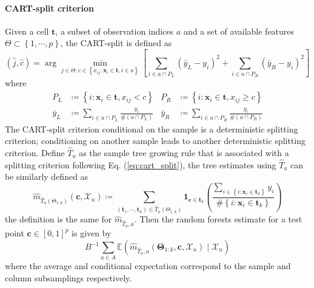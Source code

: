 \documentclass[twoside]{article}
\begin{document}
\paragraph*{CART-split criterion}
Given a cell $\mathbf{t}$, a subset of observation indices $a$ and a set of available features $\Theta \subset \left\{ 1,\cdots,p \right\}$, the CART-split is defined as 
\begin{equation}\label{eq:cart_split}
    \left(\hat{j},\hat{c}\right) = \arg\min_{j\in\Theta,c\in \left\{x_{ij}:\mathbf{x}_i\in\mathbf{t},i\in a\right\}} \left[ \sum_{i\in a \cap P_L}\left(\bar{y}_L-y_i\right)^2 + \sum_{i\in a\cap P_R}\left(\bar{y}_R-y_i\right)^2 \right]
\end{equation}
where 
\begin{align*}
    P_L & \coloneq \left\{ i: \mathbf{x}_i\in\mathbf{t},x_{ij}<c \right\} & P_R & \coloneq  \left\{ i: \mathbf{x}_i\in\mathbf{t},x_{ij}\geq c \right\}\\
    \bar{y}_L & \coloneq \sum_{i\in a \cap P_L}\frac{y_i}{\# \left(a\cap P_L\right)} & \bar{y}_R & \coloneq \sum_{i\in a \cap P_R}\frac{y_i}{\# \left(a\cap P_R\right)}
\end{align*}
The CART-split criterion conditional on the sample is a deterministic splitting criterion; conditioning on another sample leads to another deterministic splitting criterion. Define $\hat{T}_a$ as the sample tree growing rule that is associated with a splitting criterion following Eq. (\ref{eq:cart_split}), the tree estimates using $\hat{T}_a$ can be similarly defined as 
\begin{equation*}
    \hat{m}_{\hat{T}_a(\Theta_{1:k})} \left(\mathbf{c},\mathcal{X}_n\right) \coloneq \sum_{\left(\mathbf{t}_1,\cdots,\mathbf{t}_k\right)\in\hat{T}_a\left(\Theta_{1:k}\right)} \mathbf{1}_{\mathbf{c}\in\mathbf{t}_k}\left( \frac{\sum_{i\in \left\{i:\mathbf{x}_i\in \mathbf{t}_k\right\}}y_i}{\#\left\{i:\mathbf{x}_i\in\mathbf{t}_k\right\}} \right)
\end{equation*}
the definition is the same for $\hat{m}_{\hat{T}_a,a}$. Then the random forests estimate for a test point $\mathbf{c}\in [0,1]^p$ is given by 
\begin{equation*}
    B^{-1}\sum_{a\in A}\mathbb{E}\left( \hat{m}_{\hat{T}_a,a} \left(\boldsymbol{\Theta}_{1:k},\mathbf{c},\mathcal{X}_n\right) \mid \mathcal{X}_n\right)
\end{equation*}
where the average and conditional expectation correspond to the sample and column subsamplings respectively.

\citet{chi2022asymptotic}

\newpage


\end{document}

